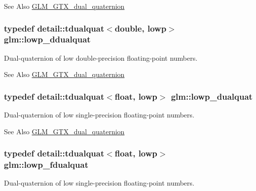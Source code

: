 \begin{DoxySeeAlso}{See Also}
\hyperlink{group__gtc__dual__quaternion}{G\-L\-M\-\_\-\-G\-T\-X\-\_\-dual\-\_\-quaternion} 
\end{DoxySeeAlso}
\hypertarget{group__gtc__dual__quaternion_ga29461fddd543ffdf65a199fc28c42458}{
\subsubsection[{lowp\-\_\-ddualquat}]{\setlength{\rightskip}{0pt plus 5cm}typedef detail\-::tdualquat$<$double, lowp$>$ {\bf glm\-::lowp\-\_\-ddualquat}}}\label{group__gtc__dual__quaternion_ga29461fddd543ffdf65a199fc28c42458}
Dual-\/quaternion of low double-\/precision floating-\/point numbers.

\begin{DoxySeeAlso}{See Also}
\hyperlink{group__gtc__dual__quaternion}{G\-L\-M\-\_\-\-G\-T\-X\-\_\-dual\-\_\-quaternion} 
\end{DoxySeeAlso}
\hypertarget{group__gtc__dual__quaternion_gae1772179edc60f4e8b46c8772eeeccee}{
\subsubsection[{lowp\-\_\-dualquat}]{\setlength{\rightskip}{0pt plus 5cm}typedef detail\-::tdualquat$<$float, lowp$>$ {\bf glm\-::lowp\-\_\-dualquat}}}\label{group__gtc__dual__quaternion_gae1772179edc60f4e8b46c8772eeeccee}
Dual-\/quaternion of low single-\/precision floating-\/point numbers.

\begin{DoxySeeAlso}{See Also}
\hyperlink{group__gtc__dual__quaternion}{G\-L\-M\-\_\-\-G\-T\-X\-\_\-dual\-\_\-quaternion} 
\end{DoxySeeAlso}
\hypertarget{group__gtc__dual__quaternion_gae62c636c63c9eb3c1ea6d10f4b7d7c81}{
\subsubsection[{lowp\-\_\-fdualquat}]{\setlength{\rightskip}{0pt plus 5cm}typedef detail\-::tdualquat$<$float, lowp$>$ {\bf glm\-::lowp\-\_\-fdualquat}}}\label{group__gtc__dual__quaternion_gae62c636c63c9eb3c1ea6d10f4b7d7c81}
Dual-\/quaternion of low single-\/precision floating-\/point numbers.

